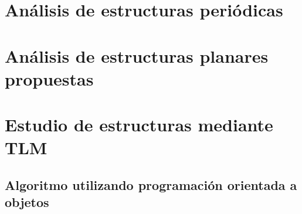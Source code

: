 
\section{Análisis de estructuras periódicas}
\label{sec_estructuras_periodicas}
\lipsum
\section{Análisis de estructuras planares propuestas}
\label{sec_estructuras_propuestas}
\lipsum
\lipsum
\section{Estudio de estructuras mediante TLM}
\label{sec_estudio_tlm}
\lipsum
\lipsum

\subsection{Algoritmo utilizando programación orientada a objetos}
\label{subsec_estudio_tlm}
\lipsum